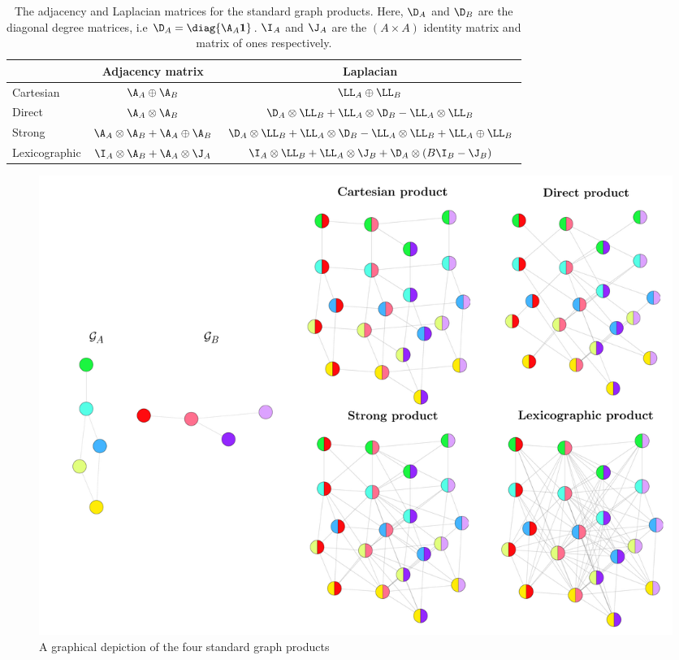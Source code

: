 \begin{table}[h]
\def\arraystretch{1.8}
\centering
\small
\vspace{0.5cm}
\begin{tabular}{|l|cc|}
    \hline 

    & Adjacency matrix
    & Laplacian \\

    \hline

    Cartesian 
    & $\A_A \oplus \A_B$ 
    & $\LL_A \oplus \LL_B$ \\

    Direct 
    & $\A_A \otimes \A_B$  
    & $\D_A \otimes \LL_B + \LL_A \otimes \D_B - \LL_A \otimes \LL_B$ \\
    
    Strong 
    & $\A_A \otimes \A_B + \A_A \oplus \A_B$ 
    & $\D_A \otimes \LL_B + \LL_A \otimes \D_B - \LL_A \otimes \LL_B + \LL_A \oplus \LL_B$ \\

    Lexicographic 
    & $\I_A \otimes \A_B + \A_A \otimes \J_A$ 
    &  $\I_A \otimes \LL_B + \LL_A \otimes \J_B + \D_A \otimes (B \I_B - \J_B)$ \\

    \hline

\end{tabular}
\vspace{0.2cm}
\caption[The adjacency and Laplacian matrices for the standard graph products]{The adjacency and Laplacian matrices for the standard graph products. Here, $\D_A$ and $\D_B$ are the diagonal degree matrices, i.e $\D_A = \diag{\A_A \mathbf{1}}$. $\I_A$ and $\J_A$ are the $(A \times A)$ identity matrix and matrix of ones respectively. } 
\vspace{0.3cm}
\label{tab:grap_product_matrices}
\end{table}

\begin{figure}[t]
    \begin{center}
    \includegraphics[width=\linewidth]{Figures/product_graphs.pdf}
    \end{center}
    \caption[Graphical depiction of the standard graph products]{A graphical depiction of the four standard graph products}
    \label{fig:graph_products}
\end{figure}


